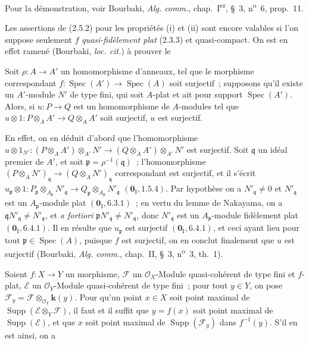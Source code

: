 Pour la démonstration, voir Bourbaki, \emph{Alg. comm.},
chap.~I\textsuperscript{er}, \S~3, n\textsuperscript{o}~6, prop.~11.

\begin{remark}[2.5.4]
\label{IV.2.5.4-fr}
Les assertions de (2.5.2) pour les propriétés (i) et (ii) sont encore
valables si l'on suppose seulement $f$ \emph{quasi-fidèlement plat} (2.3.3) et
quasi-compact. On est en effet ramené (Bourbaki, \emph{loc. cit.}) à prouver
le
\end{remark}

\begin{lemma}[2.5.4.1]
\label{IV.2.5.4.1-fr}
Soit $\rho:A\to A'$ un homomorphisme d'anneaux, tel que le morphisme
correspondant $f:\operatorname{Spec}(A')\to\operatorname{Spec}(A)$ soit
surjectif~; supposons qu'il existe un $A'$-module $N'$ de type fini, qui soit
$A$-plat et ait pour support $\operatorname{Spec}(A')$. Alors, si
$u:P\to Q$ est un homomorphisme de $A$-modules tel que
$u\otimes 1:P\otimes_A A'\longrightarrow Q\otimes_A A'$
soit surjectif, $u$ est surjectif.
\end{lemma}

En effet, on en déduit d'abord que l'homomorphisme
$u\otimes 1_{N'}:(P\otimes_A A')\otimes_{A'}N'
\longrightarrow(Q\otimes_A A')\otimes_{A'}N'$
est surjectif. Soit $\mathfrak q$ un idéal premier de $A'$, et soit
$\mathfrak p=\rho^{-1}(\mathfrak q)$~; l'homomorphisme
$(P\otimes_A N')_{\mathfrak q}\to(Q\otimes_A N')_{\mathfrak q}$
correspondant est surjectif, et il s'écrit
$u_{\mathfrak p}\otimes 1:
P_{\mathfrak p}\otimes_{A_{\mathfrak p}}N'_{\mathfrak q}
\longrightarrow
Q_{\mathfrak p}\otimes_{A_{\mathfrak p}}N'_{\mathfrak q}$
$(\mathbf{0}_{\mathrm I},1.5.4)$.
Par hypothèse on a $N'_{\mathfrak q}\ne0$ et $N'_{\mathfrak q}$ est un
$A_{\mathfrak p}$-module plat $(\mathbf{0}_{\mathrm I},6.3.1)$~; en vertu du lemme de
Nakayama, on a
$\mathfrak qN'_{\mathfrak q}\ne N'_{\mathfrak q}$, et \emph{a fortiori}
$\mathfrak pN'_{\mathfrak q}\ne N'_{\mathfrak q}$, donc
$N'_{\mathfrak q}$ est un $A_{\mathfrak p}$-module fidèlement plat
$(\mathbf{0}_{\mathrm I},6.4.1)$. Il en résulte que $u_{\mathfrak p}$ est surjectif
$(\mathbf{0}_{\mathrm I},6.4.1)$, et ceci ayant lieu pour tout
$\mathfrak p\in\operatorname{Spec}(A)$, puisque $f$ est surjectif, on en
conclut finalement que $u$ est surjectif (Bourbaki, \emph{Alg. comm.},
chap.~II, \S~3, n\textsuperscript{o}~3, th.~1).

\begin{proposition}[2.5.5]
\label{IV.2.5.5-fr}
Soient $f:X\to Y$ un morphisme, $\mathscr F$ un $\mathcal O_X$-Module
quasi-cohérent de type fini et $f$-plat, $\mathscr E$ un
$\mathcal O_Y$-Module quasi-cohérent de type fini~; pour tout $y\in Y$, on
pose $\mathscr F_y=\mathscr F\otimes_{\mathcal O_Y}\boldsymbol{k}(y)$. Pour qu'un point
$x\in X$ soit point maximal de
$\operatorname{Supp}(\mathscr E\otimes_Y\mathscr F)$, il faut et il suffit que
$y=f(x)$ soit point maximal de $\operatorname{Supp}(\mathscr E)$, et que $x$
soit point maximal de $\operatorname{Supp}(\mathscr F_y)$ dans $f^{-1}(y)$.
S'il en est ainsi, on a
\end{proposition}

